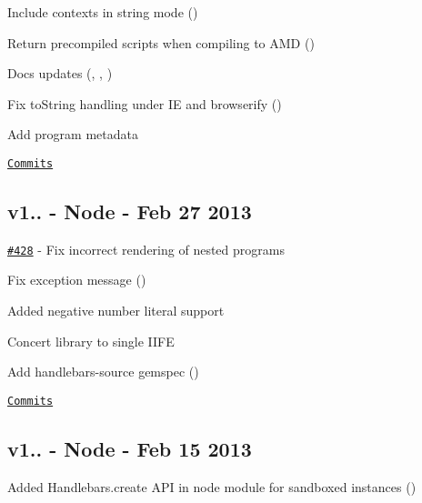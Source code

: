 \begin{DoxyItemize}
\item Include contexts in string mode (\href{https://github.com/leshill}{\tt })
\item Return precompiled scripts when compiling to A\+M\+D (\href{https://github.com/JamesMaroney}{\tt })
\item Docs updates (\href{https://github.com/iangreenleaf}{\tt }, \href{https://github.com/gilesbowkett}{\tt }, \href{https://github.com/utkarsh2012}{\tt })
\item Fix {\ttfamily to\+String} handling under I\+E and browserify (\href{https://github.com/tommydudebreaux}{\tt })
\item Add program metadata
\end{DoxyItemize}

\href{https://github.com/wycats/handlebars.js/compare/v1.0.10...v1.0.11}{\tt Commits}

\subsection*{v1.. -\/ Node -\/ Feb 27 2013}


\begin{DoxyItemize}
\item \href{https://github.com/wycats/handlebars.js/issues/428}{\tt \#428} -\/ Fix incorrect rendering of nested programs
\item Fix exception message (\href{https://github.com/tricknotes}{\tt })
\item Added negative number literal support
\item Concert library to single I\+I\+F\+E
\item Add handlebars-\/source gemspec (\href{https://github.com/machty}{\tt })
\end{DoxyItemize}

\href{https://github.com/wycats/handlebars.js/compare/v1.0.9...v1.0.10}{\tt Commits}

\subsection*{v1.. -\/ Node -\/ Feb 15 2013}


\begin{DoxyItemize}
\item Added {\ttfamily Handlebars.\+create} A\+P\+I in node module for sandboxed instances (\href{https://github.com/tommydudebreaux}{\tt })
\end{DoxyItemize}

